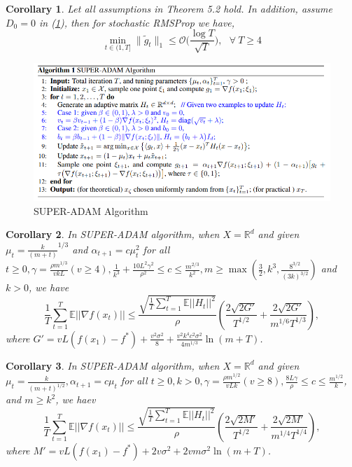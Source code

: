 \documentclass{article}
\newtheorem{corollary}{Corollary}[section]
\begin{document}
\begin{corollary}
	\label{coro51appendix}
	Let all assumptions in Theorem 5.2 hold. In addition, assume $D_0 = 0$ in (\hyperref[eq51]{1}), then for stochastic RMSProp we have,
	\[
	\min_{t \in (1, T]} \|\tilde{g}_t\|_1 \leq \mathcal{O}\Big(\frac{\log T}{\sqrt{T}}\Big), \ \ \ \forall \ T \geq 4
	\]
\end{corollary}
\begin{figure}[h]
	\label{fig2}
	\centering
	\includegraphics[scale = 0.5]{super-adam-algo.png}
	\caption{SUPER-ADAM Algorithm}
\end{figure}
\begin{corollary}
	\label{coro61appendix}
	In SUPER-ADAM algorithm, when $X=\mathbb{R}^d$ and given $\mu_t = \frac{k}{(m+t)}^{1/3}$ and $\alpha_{t+1} = c\mu^2_t$ for all $t\geq 0, \gamma = \frac{\rho m^{1/3}}{vkL}(v\geq 4), \frac{1}{k^3} + \frac{10L^2 \gamma^2}{\rho^2}\leq c \leq \frac{m^{2/3}}{k^2},
	m\geq\max(\frac{3}{2}, k^3, \frac{8^{3/2}}{(3k)^{3/2}})$ and $k > 0$, we have
	\begin{equation}
		\frac{1}{T}\sum^T_{t=1}\mathbb{E}||\nabla f(x_t)||\leq
		\frac{\sqrt{\frac{1}{T}\sum^T_{t=1}\mathbb{E}||H_t||^2}}{\rho}
		\left(\frac{2\sqrt{2G'}}{T^{1/2}} + \frac{2\sqrt{2G'}}{m^{1/6}T^{1/3}}\right),
	\end{equation}
	where $G'=vL(f(x_1) - f^*) + \frac{v^2 \sigma^2}{8} + \frac{v^2 k^4 c^2 \sigma^2}{4m^{1/3}}\ln(m+T)$.
\end{corollary}
\begin{corollary}
	\label{coro62appendix}
	In SUPER-ADAM algorithm, when $X=\mathbb{R}^d$ and given $\mu_t = \frac{k}{(m+t)^{1/2}}, \alpha_{t+1} = c\mu_t$ for all $t\geq 0, k > 0, \gamma = \frac{\rho m^{1/2}}{vLk}(v\geq 8), \frac{8L\gamma}{\rho}\leq c \leq \frac{m^{1/2}}{k}$, and $m\geq k^2$, we haev
	\begin{equation}
		\frac{1}{T}\sum^T_{t=1}\mathbb{E}||\nabla f(x_t)||\leq
		\frac{\sqrt{\frac{1}{T}\sum^T_{t=1}\mathbb{E}||H_t||^2}}{\rho}
		\left(\frac{2\sqrt{2M'}}{T^{1/2}} + \frac{2\sqrt{2M'}}{m^{1/4}T^{1/4}}\right),
	\end{equation}
	where $M'=vL(f(x_1) - f^*) + 2v\sigma^2 + 2vm\sigma^2 \ln(m+T)$.
\end{corollary}
\end{document}
